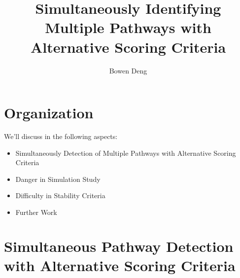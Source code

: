 \documentclass[xcolor=dvipsnames]{beamer}
\begin{document}
\title{Simultaneously Identifying Multiple Pathways with Alternative Scoring Criteria}
\author{Bowen Deng}
\date{}
\begin{frame}
\maketitle
\end{frame}
\section{Organization}
\begin{frame}
We'll discuss in the following aspects:\\
\begin{itemize}
\item Simultaneously Detection of Multiple Pathways with Alternative Scoring Criteria\\
\item Danger in Simulation Study\\
\item Difficulty in Stability Criteria\\
\item Further Work
\end{itemize}
\end{frame}
\section{Simultaneous Pathway Detection with Alternative Scoring Criteria}
\end{document}
